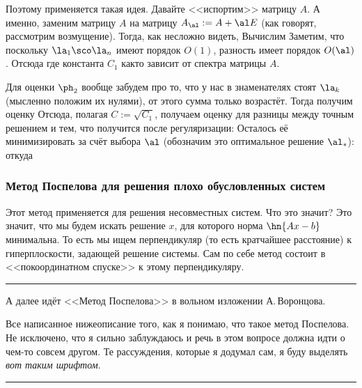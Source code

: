 \documentclass[a4paper]{article}
\newenvironment{petit}{\medskip\hrule\smallskip\footnotesize}{\par\smallskip\hrule\medskip}
\begin{document}
Поэтому применяется такая идея. Давайте <<испортим>> матрицу $A$. А именно,
заменим матрицу $A$ на матрицу $A_\al := A + \al E$ (как говорят, рассмотрим возмущение).
Тогда, как несложно видеть,
Вычислим
Заметим, что поскольку $\la_1\sco \la_n$ имеют порядок $O(1)$, разность
имеет порядок $O(\al)$. Отсюда
где константа $C_1$ как\д то зависит от спектра матрицы $A$.

Для оценки $\ph_2$ вообще забудем про то, что у нас в знаменателях стоят $\la_k$ (мысленно положим их нулями),
от этого сумма только возрастёт.
Тогда получим оценку
Отсюда, полагая $C := \sqrt{C_1}$, получаем оценку для разницы между точным решением и тем,
что получится после регуляризации:
Осталось её минимизировать за счёт выбора $\al$ (обозначим это оптимальное решение $\al_*$):
откуда

\subsubsection{Метод Поспелова для решения плохо обусловленных систем}

Этот метод применяется для решения несовместных систем. Что это значит? Это значит, что мы будем искать решение $x$, для которого
норма $\hn{Ax-b}$ минимальна. То есть мы ищем перпендикуляр (то есть кратчайшее расстояние) к гиперплоскости, задающей решение системы.
Сам по себе метод состоит в <<покоординатном спуске>> к этому перпендикуляру.

\begin{petit}
А далее идёт <<Метод Поспелова>> в вольном изложении А.\,Воронцова.

\medskip

Все написанное ниже\т описание того, как я понимаю, что такое метод
Поспелова. Не исключено, что я сильно заблуждаюсь и речь в этом
вопросе должна идти о чем-то совсем другом. Те рассуждения, которые
я додумал сам, я буду выделять \textsl{вот таким шрифтом}.

\end{petit}
\end{document}
